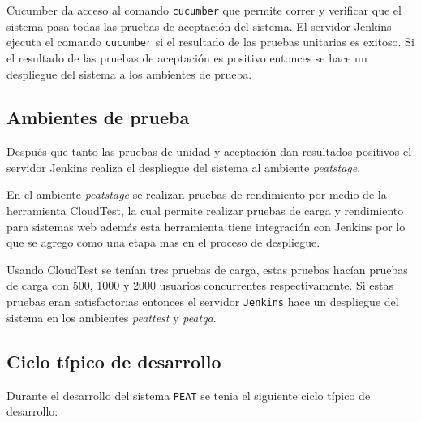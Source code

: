 Cucumber da acceso al comando \texttt{cucumber} que permite correr y verificar
que el sistema pasa todas las pruebas de aceptación del sistema. El servidor
Jenkins ejecuta el comando \texttt{cucumber} si el resultado de las pruebas
unitarias es exitoso. Si el resultado de las pruebas de aceptación es positivo
entonces se hace un despliegue del sistema a los ambientes de prueba.

\subsection{Ambientes de prueba}

Después que tanto las pruebas de unidad y aceptación dan resultados positivos el
servidor Jenkins realiza el despliegue del sistema al ambiente \textit{peatstage}.

En el ambiente \textit{peatstage} se realizan pruebas de rendimiento por medio
de la herramienta CloudTest, la cual permite realizar pruebas de carga y
rendimiento para sistemas web además esta herramienta tiene integración con
Jenkins por lo que se agrego como una etapa mas en el proceso de despliegue.

Usando CloudTest se tenían tres pruebas de carga, estas pruebas hacían pruebas de
carga con 500, 1000 y 2000 usuarios concurrentes respectivamente. Si estas pruebas
eran satisfactorias entonces el servidor \texttt{Jenkins} hace un despliegue del
sistema en los ambientes \textit{peattest} y \textit{peatqa}.

\subsection{Ciclo típico de desarrollo}

Durante el desarrollo del sistema \texttt{PEAT} se tenia el siguiente ciclo
típico de desarrollo:

